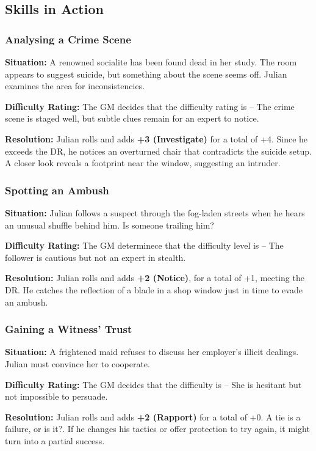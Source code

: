 \subsection{Skills in Action}


\begin{DndReadAloud}{}
	\subsubsection{Analysing a Crime Scene}
	
	\textbf{Situation:} A renowned socialite has been found dead in her study. The room appears to suggest suicide, but something about the scene seems off. Julian examines the area for inconsistencies.

	\noindent
	\textbf{Difficulty Rating:} The GM decides that the difficulty rating is \Formidable – The crime scene is staged well, but subtle clues remain for an expert to notice.

	\noindent
	\textbf{Resolution:} Julian rolls  and adds \textbf{+3 (Investigate)} for a total of +4. Since he exceeds the DR, he notices an overturned chair that contradicts the suicide setup. A closer look reveals a footprint near the window, suggesting an intruder.
\end{DndReadAloud}


\begin{DndReadAloud}{}
	\subsubsection{Spotting an Ambush}
	
	\textbf{Situation:} Julian follows a suspect through the fog-laden streets when he hears an unusual shuffle behind him. Is someone trailing him?

	\noindent\textbf{Difficulty Rating:} The GM determinece that the difficulty level is \Difficult – The follower is cautious but not an expert in stealth.

	\noindent\textbf{Resolution:} Julian rolls  and adds  \textbf{+2 (Notice)}, for a total of +1, meeting the DR. He catches the reflection of a blade in a shop window just in time to evade an ambush.
\end{DndReadAloud}


\begin{DndReadAloud}{}
	\subsubsection{Gaining a Witness’ Trust}
	
	\textbf{Situation:} A frightened maid refuses to discuss her employer’s illicit dealings. Julian must convince her to cooperate.

	\noindent\textbf{Difficulty Rating:} The GM decides that the difficulty is \Challenging – She is hesitant but not impossible to persuade.

	\noindent\textbf{Resolution:} Julian rolls \FudgeRes{+---} and adds \textbf{+2 (Rapport)} for a total of +0. A tie is a failure, or is it?. If he  changes his tactics or offer protection to try again, it might turn into a partial success.
\end{DndReadAloud}


